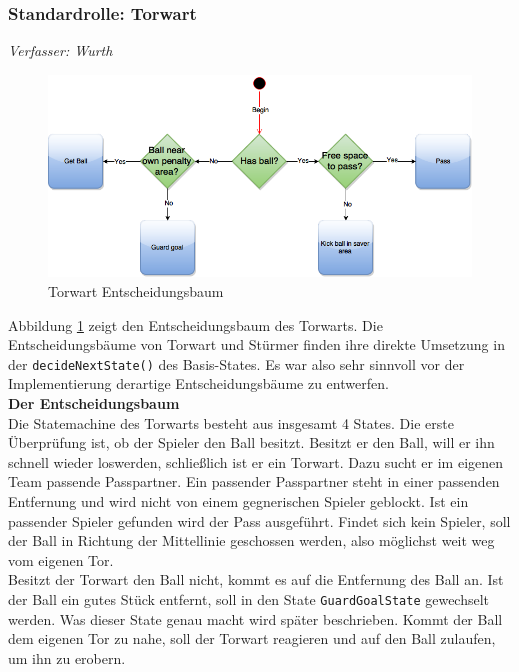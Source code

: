 \documentclass[fontsize=12pt,a4paper,final]{scrartcl}[2003/01/01]
\makeatletter
\def\ScaleIfNeeded{%
	\ifdim\Gin@nat@width>\linewidth
		\linewidth
	\else
		\Gin@nat@width
	\fi
}
\makeatother
\begin{document}
\subsubsection{Standardrolle: Torwart}
\textit{Verfasser: Wurth}\\

\begin{figure}[H]
	\centering
	\includegraphics[width=\ScaleIfNeeded]{Grafiken/KI/Keeper}
	\caption{Torwart Entscheidungsbaum}
	\label{Torwart Entscheidungsbaum}
\end{figure}

Abbildung \ref{Torwart Entscheidungsbaum} zeigt den Entscheidungsbaum des Torwarts. Die Entscheidungsbäume von Torwart und Stürmer finden ihre direkte Umsetzung in der \lstinline$decideNextState()$ des Basis-States. Es war also sehr sinnvoll vor der Implementierung derartige Entscheidungsbäume zu entwerfen.
\\

\textbf{Der Entscheidungsbaum}
\\

Die Statemachine des Torwarts besteht aus insgesamt 4 States. Die erste Überprüfung ist, ob der Spieler den Ball besitzt. Besitzt er den Ball, will er ihn schnell wieder loswerden, schließlich ist er ein Torwart. Dazu sucht er im eigenen Team passende Passpartner. Ein passender Passpartner steht in einer passenden Entfernung und wird nicht von einem gegnerischen Spieler geblockt. Ist ein passender Spieler gefunden wird der Pass ausgeführt. Findet sich kein Spieler, soll der Ball in Richtung der Mittellinie geschossen werden, also möglichst weit weg vom eigenen Tor.
\\

Besitzt der Torwart den Ball nicht, kommt es auf die Entfernung des Ball an. Ist der Ball ein gutes Stück entfernt, soll in den State \lstinline$GuardGoalState$ gewechselt werden. Was dieser State genau macht wird später beschrieben. Kommt der Ball dem eigenen Tor zu nahe, soll der Torwart reagieren und auf den Ball zulaufen, um ihn zu erobern.
\pagebreak
\end{document}
